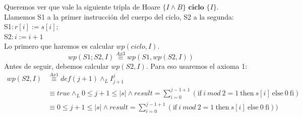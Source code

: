 \documentclass{article}
\begin{document}
\begin{enumerate}[label=\alph*)]
	Queremos ver que vale la siguiente tripla de Hoare $\{I\wedge B\} \textbf{ ciclo } \{I\}$.\\
	Llamemos S1 a la primer instrucción del cuerpo del ciclo, S2 a la segunda:\\
	S1$: r[i]:=s[i];$\\
	S2$: i:=i+1$\\
	Lo primero que haremos es calcular $wp(ciclo,I)$.
	\begin{equation}wp(S1;S2,I)\stackrel{Ax3}{\equiv}wp(S1,wp(S2,I))\end{equation}
	Antes de seguir, debemos calcular $wp(S2,I)$. Para eso usaremos el axioma 1:
	\begin{align*}
	wp(S2,I)&\stackrel{Ax1}{\equiv}def(j+1)\wedge_L I_{j+1}^{j}\\
		&\equiv true\wedge_L 0\leq j+1\leq |s| \wedge result=\sum_{i=0}^{j-1+1}(\textrm{if}\ i\ mod\ 2=1\ \textrm{then}\ s[i]\ \textrm{else}\ 0\ \textrm{fi})\\
		&\equiv 0\leq j+1\leq |s| \wedge result=\sum_{i=0}^{j-1+1}(\textrm{if}\ i\ mod\ 2=1\ \textrm{then}\ s[i]\ \textrm{else}\ 0\ \textrm{fi}))
	\end{align*}
	

\end{enumerate}
\end{document}
